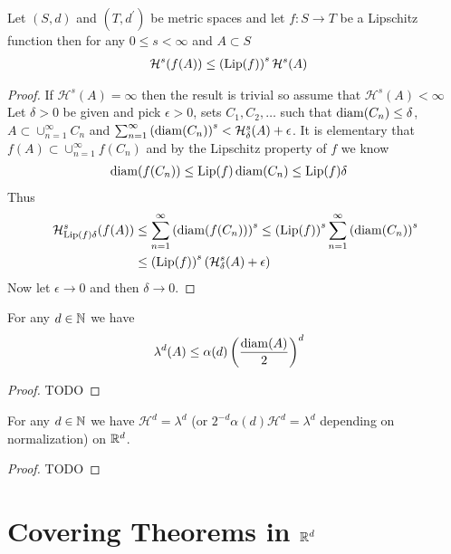 \begin{prop}\label{HausdorffMeasureUnderLipschitzMaps}Let $(S,d)$ and $(T,d^\prime)$ be metric spaces and let $f : S \to T$ be a Lipschitz function then for any $0 \leq s < \infty$ and $A \subset S$
\begin{align*}
\mathcal{H}^s(f(A)) &\leq \left ( \operatorname*{Lip}(f) \right)^s \mathcal{H}^s(A)
\end{align*}
\end{prop}
\begin{proof}
If $\mathcal{H}^s(A)=\infty$ then the result is trivial so assume that $\mathcal{H}^s(A)<\infty$
Let $\delta>0$ be given and pick $\epsilon>0$, sets $C_1, C_2, \dotsc$ such that $\operatorname*{diam}(C_n) \leq \delta$, $A \subset \cup_{n=1}^\infty C_n$ and $\sum_{n=1}^\infty \left(\operatorname*{diam}(C_n)\right)^s < \mathcal{H}^s_\delta(A)+\epsilon$.  It is elementary that $f(A) \subset \cup_{n=1}^\infty f(C_n)$ and by the Lipschitz property of $f$ we
know
\begin{align*}
\operatorname*{diam}(f(C_n)) &\leq \operatorname*{Lip}(f) \operatorname*{diam}(C_n) \leq \operatorname*{Lip}(f) \delta
\end{align*}
Thus 
\begin{align*}
\mathcal{H}_{\operatorname*{Lip}(f) \delta}^s (f(A)) &\leq \sum_{n=1}^\infty \left(\operatorname*{diam}(f(C_n))\right)^s \leq \left(\operatorname*{Lip}(f) \right)^s \sum_{n=1}^\infty\left(\operatorname*{diam}(C_n)\right)^s \\
&\leq \left(\operatorname*{Lip}(f) \right)^s \left(\mathcal{H}^s_\delta(A)+\epsilon\right )
\end{align*}
Now let $\epsilon \to 0$ and then $\delta \to 0$.
\end{proof}

\begin{thm}\label{IsodiametricInequality}For any $d \in \mathbb{N}$ we have 
\begin{align*}
\lambda^d(A) &\leq \alpha(d) \left( \frac{\operatorname*{diam}(A)}{2} \right)^d
\end{align*}
\end{thm}
\begin{proof}
TODO
\end{proof}

\begin{thm}\label{HausdorffEqualsLebesgue}For any $d \in \mathbb{N}$ we have $\mathcal{H}^d =
  \lambda^d$ (or $ 2^{-d} \alpha(d) \mathcal{H}^d =\lambda^d$ depending on normalization) on $\mathbb{R}^d$.
\end{thm}
\begin{proof}
TODO
\end{proof}

\section{Covering Theorems in $\mathbb{R}^d$}

